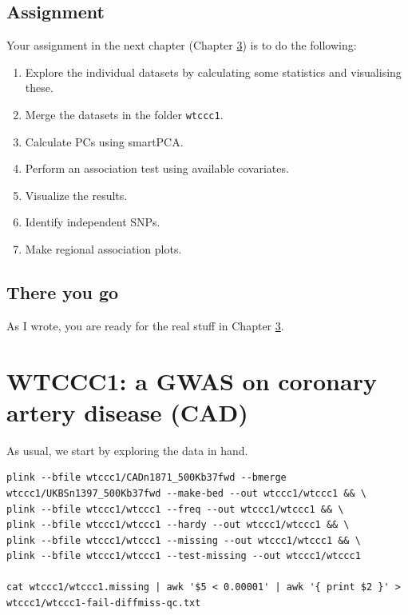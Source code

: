 \documentclass[
]{book}
\newcommand{\passthrough}[1]{#1}
\providecommand{\tightlist}{%
  \setlength{\itemsep}{0pt}\setlength{\parskip}{0pt}}
\begin{document}
\hypertarget{assignment}{%
\section{Assignment}\label{assignment}}

Your assignment in the next chapter (Chapter \ref{wtccc1}) is to do the following:

\begin{enumerate}
\def\labelenumi{\arabic{enumi}.}
\tightlist
\item
  Explore the individual datasets by calculating some statistics and visualising these.
\item
  Merge the datasets in the folder \passthrough{\lstinline!wtccc1!}.
\item
  Calculate PCs using smartPCA.
\item
  Perform an association test using available covariates.
\item
  Visualize the results.
\item
  Identify independent SNPs.
\item
  Make regional association plots.
\end{enumerate}

\hypertarget{there-you-go}{%
\section{There you go}\label{there-you-go}}

As I wrote, you are ready for the real stuff in Chapter \ref{wtccc1}.

\hypertarget{wtccc1}{%
\chapter{WTCCC1: a GWAS on coronary artery disease (CAD)}\label{wtccc1}}

As usual, we start by exploring the data in hand.

\begin{lstlisting}
plink --bfile wtccc1/CADn1871_500Kb37fwd --bmerge wtccc1/UKBSn1397_500Kb37fwd --make-bed --out wtccc1/wtccc1 && \
plink --bfile wtccc1/wtccc1 --freq --out wtccc1/wtccc1 && \
plink --bfile wtccc1/wtccc1 --hardy --out wtccc1/wtccc1 && \
plink --bfile wtccc1/wtccc1 --missing --out wtccc1/wtccc1 && \
plink --bfile wtccc1/wtccc1 --test-missing --out wtccc1/wtccc1

cat wtccc1/wtccc1.missing | awk '$5 < 0.00001' | awk '{ print $2 }' > wtccc1/wtccc1-fail-diffmiss-qc.txt
\end{lstlisting}
\end{document}
